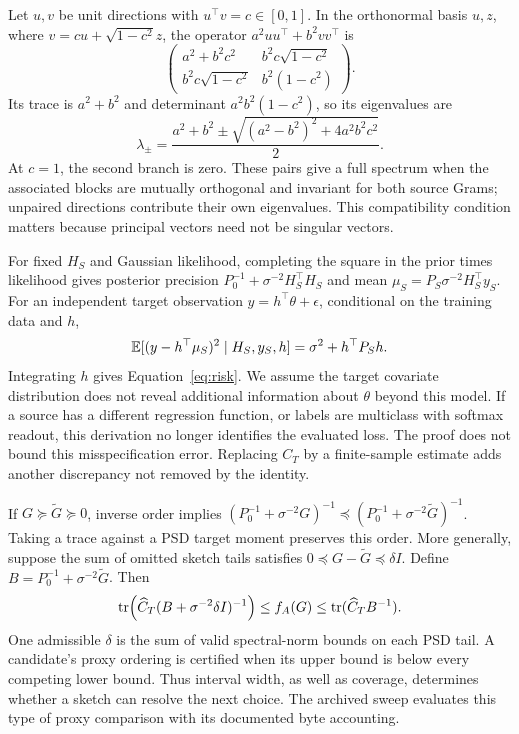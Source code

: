 Let $u,v$ be unit directions with $u^\top v=c\in[0,1]$. In the orthonormal basis $u,z$, where $v=cu+\sqrt{1-c^2}z$, the operator $a^2uu^\top+b^2vv^\top$ is
\begin{equation}
 \begin{pmatrix}
 a^2+b^2c^2 & b^2c\sqrt{1-c^2}\\
 b^2c\sqrt{1-c^2} & b^2(1-c^2)
 \end{pmatrix}.
\end{equation}
Its trace is $a^2+b^2$ and determinant $a^2b^2(1-c^2)$, so its eigenvalues are
\begin{equation}
 \lambda_{\pm}=\frac{a^2+b^2\pm\sqrt{(a^2-b^2)^2+4a^2b^2c^2}}{2}.
 \label{eq:local}
\end{equation}
At $c=1$, the second branch is zero. These pairs give a full spectrum when the associated blocks are mutually orthogonal and invariant for both source Grams; unpaired directions contribute their own eigenvalues. This compatibility condition matters because principal vectors need not be singular vectors.

For fixed $H_S$ and Gaussian likelihood, completing the square in the prior times likelihood gives posterior precision $P_0^{-1}+\sigma^{-2}H_S^\top H_S$ and mean $\mu_S=P_S\sigma^{-2}H_S^\top y_S$. For an independent target observation $y=h^\top\theta+\epsilon$, conditional on the training data and $h$,
\begin{equation}
 \mathbb{E}[(y-h^\top\mu_S)^2\mid H_S,y_S,h]=\sigma^2+h^\top P_Sh.
\end{equation}
Integrating $h$ gives Equation~\eqref{eq:risk}. We assume the target covariate distribution does not reveal additional information about $\theta$ beyond this model. If a source has a different regression function, or labels are multiclass with softmax readout, this derivation no longer identifies the evaluated loss. The proof does not bound this misspecification error. Replacing $C_T$ by a finite-sample estimate adds another discrepancy not removed by the identity.

If $G\succeq\widetilde G\succeq0$, inverse order implies $(P_0^{-1}+\sigma^{-2}G)^{-1}\preceq(P_0^{-1}+\sigma^{-2}\widetilde G)^{-1}$. Taking a trace against a PSD target moment preserves this order. More generally, suppose the sum of omitted sketch tails satisfies $0\preceq G-\widetilde G\preceq\delta I$. Define $B=P_0^{-1}+\sigma^{-2}\widetilde G$. Then
\begin{equation}
 \operatorname{tr}\!\left(\widehat C_T(B+\sigma^{-2}\delta I)^{-1}\right)
 \leq f_A(G)\leq\operatorname{tr}(\widehat C_TB^{-1}).
 \label{eq:interval}
\end{equation}
One admissible $\delta$ is the sum of valid spectral-norm bounds on each PSD tail. A candidate's proxy ordering is certified when its upper bound is below every competing lower bound. Thus interval width, as well as coverage, determines whether a sketch can resolve the next choice. The archived sweep evaluates this type of proxy comparison with its documented byte accounting.


